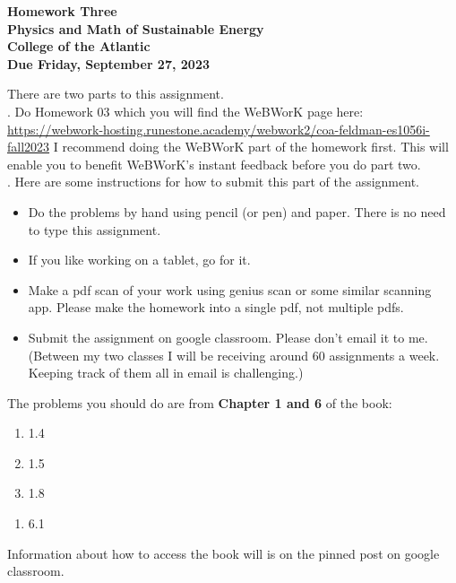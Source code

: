 \documentclass[12pt]{article}
\begin{document}
\pagestyle{empty}
 
\begin{center}
{\LARGE {\bf Homework Three}}\\
\bigskip
{\Large {\bf Physics and Math of Sustainable Energy}}\\
\bigskip
{\Large {\bf College of the Atlantic}}\\
\bigskip
{ {\bf Due Friday, September 27, 2023}}\\ 
\end{center}
\medskip


\noindent There are two parts to this assignment.\\

.  Do Homework 03 which you
will find the WeBWorK page here:
\url{https://webwork-hosting.runestone.academy/webwork2/coa-feldman-es1056i-fall2023}
I recommend doing the WeBWorK part of the homework first.  This will
enable you to benefit WeBWorK's instant feedback before you do part
two.\\ 


.  Here are some
instructions for how to submit this part of the assignment.
\begin{itemize}
\item Do the problems by hand using pencil (or pen) and paper.
  There is no need to type this assignment.
\item If you like working on a tablet, go for it. 
\item Make a pdf scan of your work using genius scan or some
  similar scanning app.  Please make the homework into a single
  pdf, not multiple pdfs.
\item Submit the assignment on google classroom.  Please don't
  email it to me.  (Between my two classes I will be receiving
  around 60 assignments a week.  Keeping track of them all in email 
  is challenging.)\\
\end{itemize}

\noindent The problems you should do are from {\bf Chapter 1 and 6} of the
book: \\ 


\begin{enumerate}
\setlength{\itemsep}{-1mm}
\item 1.4
\item 1.5
\item 1.8
\end{enumerate}

  \begin{enumerate}
    \setlength{\itemsep}{-1mm}
  \item 6.1
  \end{enumerate}
  
\noindent Information about how to access the book will is on the
pinned post on google classroom. 
\end{document}
